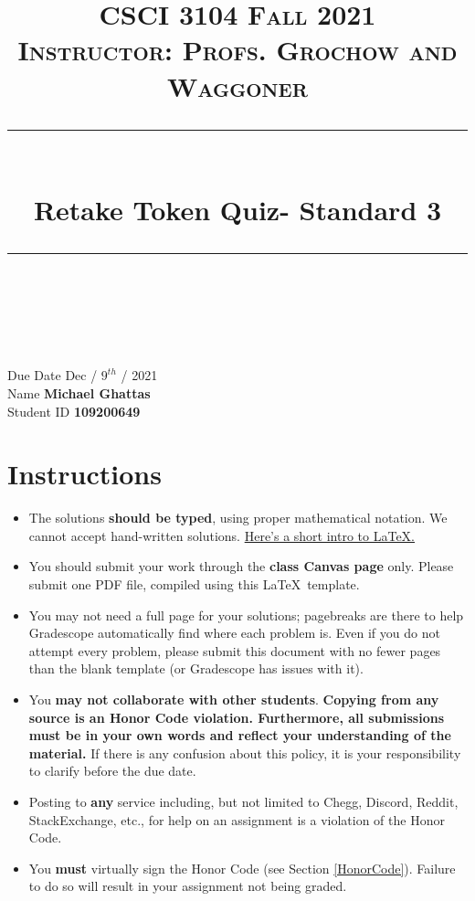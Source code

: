 \documentclass[11pt]{article}
\title{
\normalfont \normalsize 
\textsc{CSCI 3104 Fall 2021 \\ 
Instructor: Profs. Grochow and Waggoner} \\
[10pt] 
\rule{\linewidth}{0.5pt} \\[6pt] 
\huge Retake Token Quiz- Standard 3 \\
\rule{\linewidth}{2pt}  \\[10pt]
}
\date{}
\theoremstyle{definition}
\theoremstyle{definition}
\theoremstyle{definition}
\begin{document}
\maketitle


\noindent
Due Date \dotfill Dec / $9^{th}$ / 2021 \\
Name \dotfill \textbf{Michael Ghattas} \\
Student ID \dotfill \textbf{109200649} \\


\tableofcontents

\section{Instructions}
 \begin{itemize}
	\item The solutions \textbf{should be typed}, using proper mathematical notation. We cannot accept hand-written solutions. \href{http://ece.uprm.edu/~caceros/latex/introduction.pdf}{Here's a short intro to \LaTeX.}
	\item You should submit your work through the \textbf{class Canvas page} only. Please submit one PDF file, compiled using this \LaTeX \ template.
	\item You may not need a full page for your solutions; pagebreaks are there to help Gradescope automatically find where each problem is. Even if you do not attempt every problem, please submit this document with no fewer pages than the blank template (or Gradescope has issues with it).

	\item You \textbf{may not collaborate with other students}. \textbf{Copying from any source is an Honor Code violation. Furthermore, all submissions must be in your own words and reflect your understanding of the material.} If there is any confusion about this policy, it is your responsibility to clarify before the due date. 

	\item Posting to \textbf{any} service including, but not limited to Chegg, Discord, Reddit, StackExchange, etc., for help on an assignment is a violation of the Honor Code.

	\item You \textbf{must} virtually sign the Honor Code (see Section \ref{HonorCode}). Failure to do so will result in your assignment not being graded.
\end{itemize}
\end{document}
